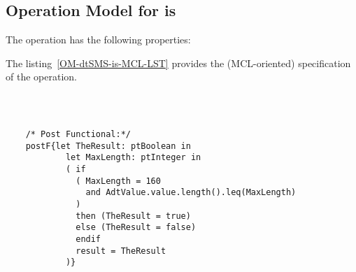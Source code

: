 \subsection{Operation Model for is}

\label{OM-is}


The  operation has the following properties:

	\begin{operationmodel}



		


	\end{operationmodel}



	\vspace{1cm}
	The listing~\ref{OM-dtSMS-is-MCL-LST} provides the \msrmessir (MCL-oriented) specification of the operation.
	
	\scriptsize
	\vspace{0.5cm}
	\begin{lstlisting}[style=MessirStyle,firstnumber=auto,captionpos=b,caption={\msrmessir (MCL-oriented) specification of the operation \emph{is}.},label=OM-dtSMS-is-MCL-LST]

	
	
	/* Post Functional:*/ 
	postF{let TheResult: ptBoolean in
	        let MaxLength: ptInteger in
	        ( if
	          ( MaxLength = 160
	            and AdtValue.value.length().leq(MaxLength)
	          )
	          then (TheResult = true)
	          else (TheResult = false)
	          endif
	          result = TheResult
	        )}
	
	
	\end{lstlisting}
	\normalsize 
	
	
	
	





